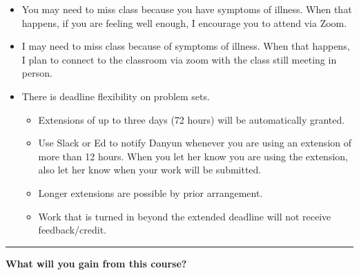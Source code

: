 \documentclass[12pt,letterpaper]{exam}
\begin{document}
\begin{itemize}
\itemsep0pt
    \item You may need to miss class because you have symptoms of illness.  When that happens, if you are feeling well enough, I encourage you to attend via Zoom.
    \item I may need to miss class because of symptoms of illness.  When that happens, I plan to connect to the classroom via zoom with the class still meeting in person.
    \item There is deadline flexibility on problem sets.
    \begin{itemize}
    \itemsep0pt
        \item Extensions of up to three days (72 hours) will be automatically granted.
        \item Use Slack or Ed to notify Danyun whenever you are using an extension of more than 12 hours.  When you let her know you are using the extension, also let her know when your work will be submitted.
        \item Longer extensions are possible by prior arrangement.
        \item Work that is turned in beyond the extended deadline will not receive feedback/credit.
    \end{itemize}  
\end{itemize}

\vspace{0.5cm}

\hrule
\vspace{0.5cm}

\noindent \textbf{What will you gain from this course?}
\end{document}
